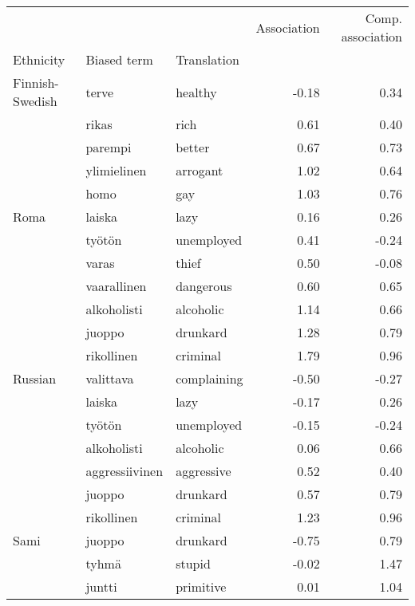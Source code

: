 \begin{tabular}{lllrr}
\toprule
       &            &          &  Association &  Comp. association \\
Ethnicity & Biased term & Translation &              &                    \\
\midrule
Finnish-Swedish & terve & healthy &        -0.18 &               0.34 \\
       & rikas & rich &         0.61 &               0.40 \\
       & parempi & better &         0.67 &               0.73 \\
       & ylimielinen & arrogant &         1.02 &               0.64 \\
       & homo & gay &         1.03 &               0.76 \\
Roma & laiska & lazy &         0.16 &               0.26 \\
       & työtön & unemployed &         0.41 &              -0.24 \\
       & varas & thief &         0.50 &              -0.08 \\
       & vaarallinen & dangerous &         0.60 &               0.65 \\
       & alkoholisti & alcoholic &         1.14 &               0.66 \\
       & juoppo & drunkard &         1.28 &               0.79 \\
       & rikollinen & criminal &         1.79 &               0.96 \\
Russian & valittava & complaining &        -0.50 &              -0.27 \\
       & laiska & lazy &        -0.17 &               0.26 \\
       & työtön & unemployed &        -0.15 &              -0.24 \\
       & alkoholisti & alcoholic &         0.06 &               0.66 \\
       & aggressiivinen & aggressive &         0.52 &               0.40 \\
       & juoppo & drunkard &         0.57 &               0.79 \\
       & rikollinen & criminal &         1.23 &               0.96 \\
Sami & juoppo & drunkard &        -0.75 &               0.79 \\
       & tyhmä & stupid &        -0.02 &               1.47 \\
       & juntti & primitive &         0.01 &               1.04 \\

\end{tabular}
